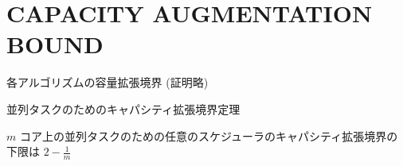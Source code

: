 
\section{CAPACITY AUGMENTATION BOUND}
\label{sec: CAPACITY AUGMENTATION BOUND}

\begin{frame}{各アルゴリズムの容量拡張境界 (証明略)}
\end{frame}

\begin{frame}[label=theorem1]{並列タスクのためのキャパシティ拡張境界定理}
    \begin{theorem}[]
        $m$ コア上の並列タスクのための任意のスケジューラのキャパシティ拡張境界の下限は $2-\frac{1}{m}$
    \end{theorem}
\end{frame}
